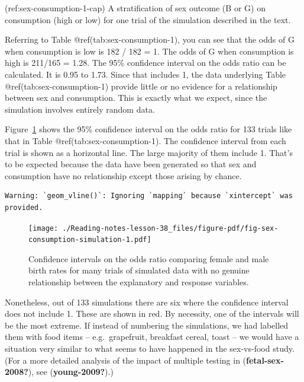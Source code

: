 \documentclass[
  letterpaper,
  DIV=11,
  numbers=noendperiod,
  oneside]{scrreprt}
\begin{document}
(ref:sex-consumption-1-cap) A stratification of sex outcome (B or G) on
consumption (high or low) for one trial of the simulation described in
the text.

Referring to Table @ref(tab:sex-consumption-1), you can see that the
odds of G when consumption is low is 182 / 182 = 1. The odds of G when
consumption is high is 211/165 = 1.28. The 95\% confidence interval on
the odds ratio can be calculated. It is 0.95 to 1.73. Since that
includes 1, the data underlying Table @ref(tab:sex-consumption-1)
provide little or no evidence for a relationship between sex and
consumption. This is exactly what we expect, since the simulation
involves entirely random data.

Figure~\ref{fig-sex-consumption-simulation} shows the 95\% confidence
interval on the odds ratio for 133 trials like that in Table
@ref(tab:sex-consumption-1). The confidence interval from each trial is
shown as a horizontal line. The large majority of them include 1. That's
to be expected because the data have been generated so that sex and
consumption have no relationship except those arising by chance.

\begin{verbatim}
Warning: `geom_vline()`: Ignoring `mapping` because `xintercept` was provided.
\end{verbatim}

\begin{figure}

{\centering \texttt{[image: ./Reading-notes-lesson-38\_files/figure-pdf/fig-sex-consumption-simulation-1.pdf]}

}

\caption{\label{fig-sex-consumption-simulation}Confidence intervals on
the odds ratio comparing female and male birth rates for many trials of
simulated data with no genuine relationship between the explanatory and
response variables.}

\end{figure}

Nonetheless, out of 133 simulations there are six where the confidence
interval does not include 1. These are shown in red. By necessity, one
of the intervals will be the most extreme. If instead of numbering the
simulations, we had labelled them with food items -- e.g.~grapefruit,
breakfast cereal, toast -- we would have a situation very similar to
what seems to have happened in the sex-vs-food study. (For a more
detailed analysis of the impact of multiple testing in
(\textbf{fetal-sex-2008?}), see (\textbf{young-2009?}).)
\end{document}
